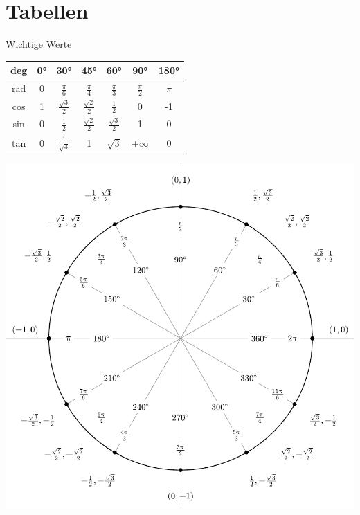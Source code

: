 \documentclass[a4paper,10pt]{article}
\begin{document}

\section{Tabellen}

\begin{mainbox}{Wichtige Werte}
  \begin{center} 
   \begin{tabular}{c|cccccc}
    deg & 0° & 30° & 45° & 60° & 90° & 180° \\
    \midrule
    rad & 0 & $\frac{\pi}{6}$ & $\frac{\pi}{4}$ & $\frac{\pi}{3}$ & $\frac{\pi}{2}$ & $\pi$ \\
    cos & 1 & $\frac{\sqrt{3}}{2}$ & $\frac{\sqrt{2}}{2}$ & $\frac{1}{2}$ & 0 & -1 \\
    sin & 0 & $\frac{1}{2}$ & $\frac{\sqrt{2}}{2}$ & $\frac{\sqrt{3}}{2}$ & 1 & 0 \\
    tan & 0 & $\frac{1}{\sqrt{3}}$ & 1 & $\sqrt{3}$ & $+\infty$ & 0 \\
   \end{tabular}
  \end{center}
\end{mainbox}

\begin{center}
  \includegraphics[width=\linewidth]{degrees_circle.pdf}
\end{center}
\end{document}
